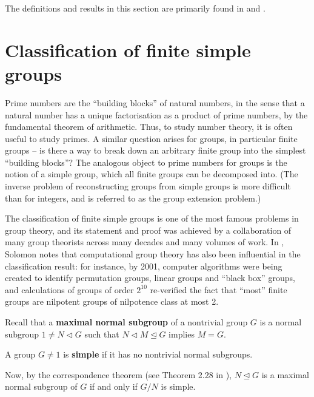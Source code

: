 The definitions and results in this section are primarily found in \cite{rotman_intro_theory_groups1995} and \cite{dixon_mortimer_perm_groups1996}.

\section{Classification of finite simple groups}

Prime numbers are the ``building blocks'' of natural numbers, in the sense that a natural number has a unique factorisation as a product of prime numbers, by the fundamental theorem of arithmetic. Thus, to study number theory, it is often useful to study primes. A similar question arises for groups, in particular finite groups -- is there a way to break down an arbitrary finite group into the simplest ``building blocks''? The analogous object to prime numbers for groups is the notion of a simple group, which all finite groups can be decomposed into. (The inverse problem of reconstructing groups from simple groups is more difficult than for integers, and is referred to as the group extension problem.)

The classification of finite simple groups is one of the most famous problems in group theory, and its statement and proof was achieved by a collaboration of many group theorists across many decades and many volumes of work. In \cite{solomon2001}, Solomon notes that computational group theory has also been influential in the classification result: for instance, by 2001, computer algorithms were being created to identify permutation groups, linear groups and ``black box'' groups, and calculations of groups of order $2^{10}$ re-verified the fact that ``most'' finite groups are nilpotent groups of nilpotence class at most 2.

Recall that a \textbf{maximal normal subgroup} of a nontrivial group $G$ is a normal subgroup $1 \neq N \lhd G$ such that $N \lhd M \unlhd G$ implies $M = G$.

\begin{definition}\label{def:simple_group}
    A group $G \neq 1$ is \textbf{simple} if it has no nontrivial normal subgroups.
\end{definition}

 Now, by the correspondence theorem (see Theorem 2.28 in \cite{rotman_intro_theory_groups1995}), $N \unlhd G$ is a maximal normal subgroup of $G$ if and only if $G/N$ is simple. 

